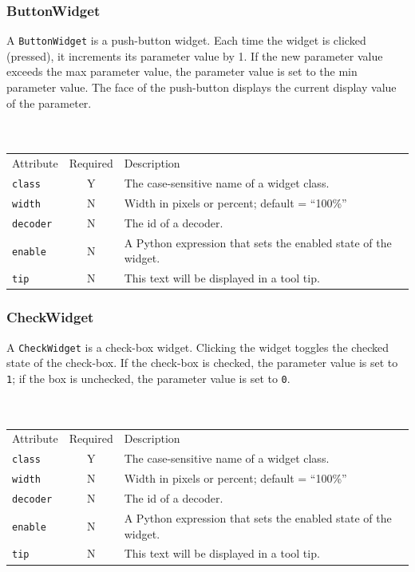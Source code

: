 \documentclass[a4paper,twoside,12pt]{article}
\newcommand{\code}[1]{\color{red}\texttt{#1}\color{black}}
\begin{document}
\subsubsection{ButtonWidget}
A \code{ButtonWidget}{} is a push-button widget. Each time the
widget is clicked (pressed), it increments its parameter value by
1. If the new parameter value exceeds the max parameter value, the
parameter value is set to the min parameter value. The face of the
push-button displays the current display value of the parameter.
\\
\\
\\
\begin{tabular}{|l|c|p{9cm}|}
\hline
Attribute & Required & Description \\
\code{class} & Y & The case-sensitive name of a widget class. \\
\code{width} & N & Width in pixels or percent; default = ``100\%'' \\
\code{decoder} & N & The id of a decoder. \\
\code{enable} & N & A Python expression that sets the
enabled state of the widget. \\
\code{tip} & N & This text will be displayed in a tool tip. \\
\hline
\end{tabular}

\subsubsection{CheckWidget}
A \code{CheckWidget}{} is a check-box widget. Clicking the widget
toggles the checked state of the check-box. If the check-box is
checked, the parameter value is set to \code{1}{}; if the box is
unchecked, the parameter value is set to \code{0}{}.
\\
\\
\\
\begin{tabular}{|l|c|p{9cm}|}
\hline
Attribute & Required & Description \\
\code{class} & Y & The case-sensitive name of a widget class. \\
\code{width} & N & Width in pixels or percent; default = ``100\%'' \\
\code{decoder} & N & The id of a decoder. \\
\code{enable} & N & A Python expression that sets the
enabled state of the widget. \\
\code{tip} & N & This text will be displayed in a tool tip. \\
\hline
\end{tabular}
\end{document}
